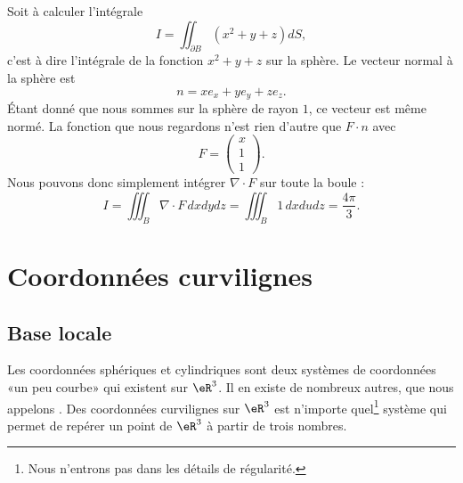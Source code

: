 \begin{example}
    Soit à calculer l'intégrale
    \begin{equation}
        I=\iint_{\partial B}(x^2+y+z)dS,
    \end{equation}
    c'est à dire l'intégrale de la fonction $x^2+y+z$ sur la sphère. Le vecteur normal à la sphère est
    \begin{equation}
        n=xe_x+ye_y+ze_z.
    \end{equation}
    Étant donné que nous sommes sur la sphère de rayon $1$, ce vecteur est même normé. La fonction que nous regardons n'est rien d'autre que $F\cdot n$ avec
    \begin{equation}
        F=\begin{pmatrix}
            x    \\ 
            1    \\ 
            1    
        \end{pmatrix}.
    \end{equation}
    Nous pouvons donc simplement intégrer $\nabla\cdot F$ sur toute la boule :
    \begin{equation}
        I=\iiint_{B}\nabla\cdot F\,dxdydz=\iiint_B 1\,dxdudz=\frac{ 4\pi }{ 3 }.
    \end{equation}
\end{example}

\section{Coordonnées curvilignes}

\subsection{Base locale}

Les coordonnées sphériques et cylindriques sont deux systèmes de coordonnées «un peu courbe» qui existent sur $\eR^3$. Il en existe de nombreux autres, que nous appelons . Des coordonnées curvilignes sur $\eR^3$ est n'importe quel\footnote{Nous n'entrons pas dans les détails de régularité.} système qui permet de repérer un point de $\eR^3$ à partir de trois nombres.

